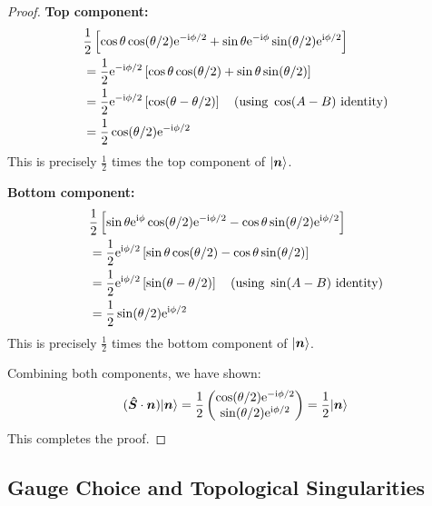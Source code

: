 \begin{proof}
    \textbf{Top component:}
    \begin{equation}\begin{aligned}
        & \frac{1}{2} \left[ \cos\theta \cos(\theta/2) \mathrm{e}^{-\mathrm{i}\phi/2} + \sin\theta \mathrm{e}^{-\mathrm{i}\phi} \sin(\theta/2) \mathrm{e}^{\mathrm{i}\phi/2} \right] \\
        &= \frac{1}{2} \mathrm{e}^{-\mathrm{i}\phi/2} \left[ \cos\theta \cos(\theta/2) + \sin\theta \sin(\theta/2) \right] \\
        &= \frac{1}{2} \mathrm{e}^{-\mathrm{i}\phi/2} \left[ \cos(\theta - \theta/2) \right] \quad \text{(using } \cos(A-B) \text{ identity)} \\
        &= \frac{1}{2} \cos(\theta/2) \mathrm{e}^{-\mathrm{i}\phi/2}
    \end{aligned}\end{equation}
    This is precisely $\frac{1}{2}$ times the top component of $|\bm{n}\rangle$.

    \textbf{Bottom component:}
    \begin{equation}\begin{aligned}
        & \frac{1}{2} \left[ \sin\theta \mathrm{e}^{\mathrm{i}\phi} \cos(\theta/2) \mathrm{e}^{-\mathrm{i}\phi/2} - \cos\theta \sin(\theta/2) \mathrm{e}^{\mathrm{i}\phi/2} \right] \\
        &= \frac{1}{2} \mathrm{e}^{\mathrm{i}\phi/2} \left[ \sin\theta \cos(\theta/2) - \cos\theta \sin(\theta/2) \right] \\
        &= \frac{1}{2} \mathrm{e}^{\mathrm{i}\phi/2} \left[ \sin(\theta - \theta/2) \right] \quad \text{(using } \sin(A-B) \text{ identity)} \\
        &= \frac{1}{2} \sin(\theta/2) \mathrm{e}^{\mathrm{i}\phi/2}
    \end{aligned}\end{equation}
    This is precisely $\frac{1}{2}$ times the bottom component of $|\bm{n}\rangle$.

    Combining both components, we have shown:
    \begin{equation}
        (\bm{\hat{S}} \cdot \bm{n}) |\bm{n}\rangle = \frac{1}{2} \begin{pmatrix}
        \cos(\theta/2) \mathrm{e}^{-\mathrm{i}\phi/2} \\
        \sin(\theta/2) \mathrm{e}^{\mathrm{i}\phi/2}
        \end{pmatrix}
        = \frac{1}{2} |\bm{n}\rangle
    \end{equation}
    This completes the proof. 
\end{proof}


\subsection{Gauge Choice and Topological Singularities}


